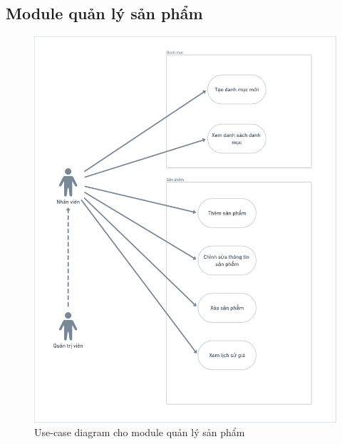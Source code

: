 \subsection{Module quản lý sản phẩm}
\begin{figure}[h]
    \centering
    \includegraphics[scale = 0.2]{img/mod/qlsp-mod.png}
    \vspace{1cm}
    \caption{Use-case diagram cho module quản lý sản phẩm}
    \label{fig:taskAssignment}
\end{figure}

